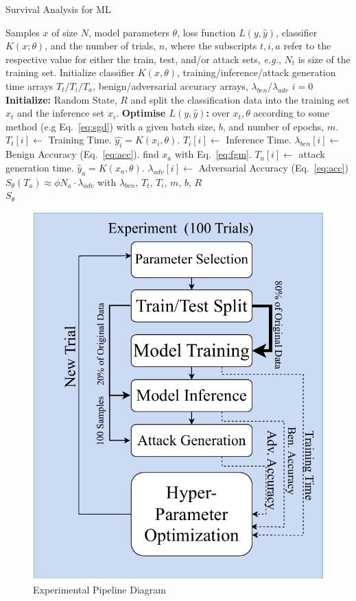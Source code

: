 \documentclass[conference]{IEEEtran}
\begin{document}
\begin{algorithm}[h!]
    \caption{Survival Analysis for ML}
    \label{fig:alg}
\begin{algorithmic}
    \Require Samples $x$ of size $N$, model parameters $\theta$, loss function $L(y, \hat{y})$, classifier $K(x; \theta)$, and the number of trials, $n$, where the subscripts $t,i,a$ refer to the respective value for either the train, test, and/or attack sets, \textit{e.g.}, $N_t$ is size of the training set.
    \State Initialize classifier $K(x, \theta)$, training/inference/attack generation time arrays $T_t/T_i/T_a$, benign/adversarial accuracy arrays, $\lambda_{ben}/ \lambda_{adv}$
    \State $i = 0$
    \State \textbf{Initialize:} Random State, $R$ and split the classification data into the training set $x_t$ and the inference set $x_i$.
    \State \textbf{Optimise $L(y, \hat{y})$:} over $x_t, \theta$ according to some method (e.g Eq.~\ref{eq:sgd}) with a given batch size, $b$, and number of epochs, $m$.
    \State  $T_t[i] \gets$ Training Time.
    \State  $ \hat{y_i} = K(x_i, \theta) $.
    \State  $ T_i[i] \gets $  Inference Time.
    \State  $\lambda_{ben}[i] \gets $  Benign Accuracy (Eq.~\ref{eq:acc}).
    \State find $x_a$ with Eq.~\ref{eq:fgm}.
    \State  $T_a[i] \gets$ attack generation time.
    \State  $ \hat{y}_a = K(x_a, \theta) $.
    \State  $\lambda_{adv}[i] \gets $  Adversarial Accuracy (Eq.~\ref{eq:acc})
    \EndWhile
    \State $S_{\theta}(T_a) \approx \phi N_a \cdot \lambda_{adv}$ with $\lambda_{ben}$, $T_t$, $T_i$, $m$, $b$, $R$ \\
    \Return $S_{\theta}$
\end{algorithmic}
\end{algorithm}


\begin{figure}
    \centering
    \includegraphics[width=.35\textwidth]{plots/experiment.pdf}
    \caption{Experimental Pipeline Diagram}
    \label{fig:experiments}
\end{figure}
\end{document}
